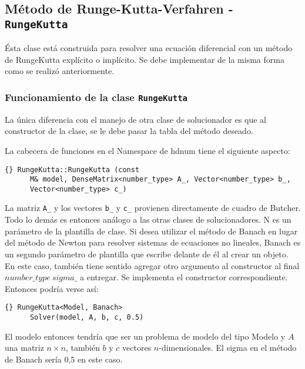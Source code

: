 \subsection{Método de Runge-Kutta-Verfahren - \lstinline{RungeKutta}}
Ésta clase está construida para resolver una ecuación diferencial con un método 
de RungeKutta explícito o implícito. Se debe implementar de la misma forma como 
se realizó anteriormente.  

\subsubsection{Funcionamiento de la clase \lstinline{RungeKutta}}
La única diferencia con el manejo de otra clase de solucionador es que 
al constructor de la clase, se le debe pasar la tabla del método deseado.

La cabecera de funciones en el Namespace de hdnum tiene el siguiente aspecto: 

{\footnotesize{\begin{lstlisting}{} RungeKutta::RungeKutta (const
      M& model, DenseMatrix<number_type> A_, Vector<number_type> b_,
      Vector<number_type> c_)
\end{lstlisting}}}

La matriz \lstinline{A_} y los vectores \lstinline{b_} y
\lstinline{c_} provienen directamente de cuadro de Butcher. Todo lo demás es entonces 
análogo a las otras clases de solucionadores. N es un parámetro de la plantilla de clase. 
Si desea utilizar el método de Banach en lugar del método de Newton para resolver sistemas 
de ecuaciones no lineales, Banach es un segundo parámetro de plantilla que escribe 
delante de él al crear un objeto. En este caso, también tiene sentido agregar otro 
argumento al constructor al final $number\_type \ sigma\_$ a entregar. Se implementa 
el constructor correspondiente. Entonces podría verse así:
{\footnotesize{\begin{lstlisting}{} RungeKutta<Model, Banach>
      Solver(model, A, b, c, 0.5)
\end{lstlisting}}}

El modelo entonces tendría que ser un problema de modelo del tipo Modelo y $A$ una matriz 
$n \times n$, también $b$ y $c$ vectores $n$-dimensionales. El sigma en el 
método de Banach sería 0,5 en este caso.


